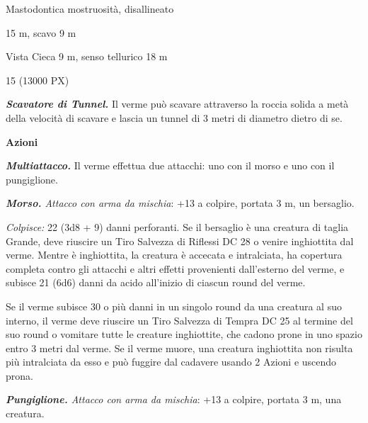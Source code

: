 \begin{multicols}{2}
{
\begin{description}[noitemsep, topsep=0pt, parsep=0pt, partopsep=0pt, itemsep=1pt, leftmargin=2.35cm,  labelwidth=2.2cm, itemindent=0cm, listparindent=0pt] %
\setlength{\baselineskip}{10pt}
\item[\textbf{Taglia/Tipo}] Mastodontica mostruosità, disallineato
\item[\textbf{Caratt.}] 
\item[\textbf{Punti Ferita}] 
\item[\textbf{Movimento}] 15 m, scavo 9 m
\item[\textbf{Tiri Salvez.}] 
\item[\textbf{Sensi}] Vista Cieca 9 m, senso tellurico 18 m
\item[\textbf{Sfida}] 15 (13000 PX)
\end{description}
\smallskip

\emph{\textbf{Scavatore di Tunnel.}} Il verme può scavare attraverso la roccia solida a metà della velocità di scavare e lascia un tunnel di 3 metri di diametro dietro di se.

\textbf{Azioni}

\emph{\textbf{Multiattacco.}} Il verme effettua due attacchi: uno con il morso e uno con il pungiglione.

\emph{\textbf{Morso.} Attacco con arma da mischia}: +13 a colpire, portata 3 m, un bersaglio.

\emph{Colpisce:} 22 (3d8 + 9) danni perforanti. Se il bersaglio è una creatura di taglia Grande, deve riuscire un Tiro Salvezza di Riflessi DC 28 o venire inghiottita dal verme. Mentre è inghiottita, la creatura è accecata e intralciata, ha copertura completa contro gli attacchi e altri effetti provenienti dall'esterno del verme, e subisce 21 (6d6) danni da acido all'inizio di ciascun round del verme.

Se il verme subisce 30 o più danni in un singolo round da una creatura al suo interno, il verme deve riuscire un Tiro Salvezza di Tempra DC 25 al termine del suo round o vomitare tutte le creature inghiottite, che cadono prone in uno spazio entro 3 metri dal verme. Se il verme muore, una creatura inghiottita non risulta più intralciata da esso e può fuggire dal cadavere usando 2 Azioni e uscendo prona.

\emph{\textbf{Pungiglione.} Attacco con arma da mischia}: +13 a colpire, portata 3 m, una creatura.

}
\end{multicols}
